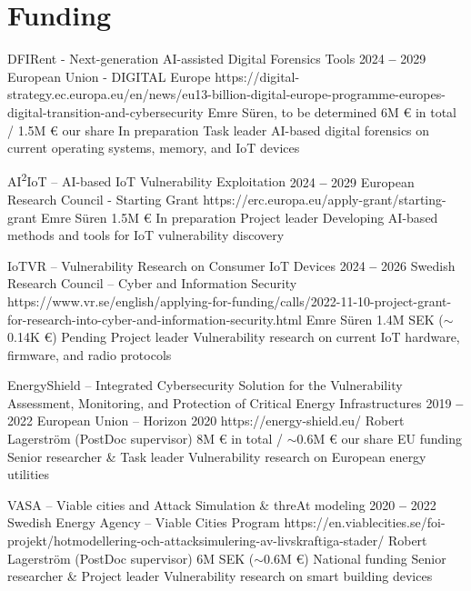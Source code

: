 

\section{Funding}


    \itemizeCVBegin[nolabel]{}
        
        \fundingItem
            {DFIRent - Next-generation AI-assisted Digital Forensics Tools}
            {2024 \textbf{--} 2029}
            {European Union - DIGITAL Europe}
            {https://digital-strategy.ec.europa.eu/en/news/eu13-billion-digital-europe-programme-europes-digital-transition-and-cybersecurity}
            {Emre Süren, to be determined}
            {6M € in total / 1.5M € our share}
            {In preparation}
            {Task leader}
            {AI-based digital forensics on current operating systems, memory, and IoT devices}

        \fundingItem
            {AI\textsuperscript{2}IoT – AI-based IoT Vulnerability Exploitation}
            {2024 \textbf{--} 2029}
            {European Research Council - Starting Grant}
            {https://erc.europa.eu/apply-grant/starting-grant}
            {Emre Süren}
            {1.5M €}
            {In preparation}
            {Project leader}
            {Developing AI-based methods and tools for IoT vulnerability discovery}

        \fundingItem
            {IoTVR – Vulnerability Research on Consumer IoT Devices}
            {2024 \textbf{--} 2026}
            {Swedish Research Council – Cyber and Information Security}
            {https://www.vr.se/english/applying-for-funding/calls/2022-11-10-project-grant-for-research-into-cyber-and-information-security.html}
            {Emre Süren}
            {1.4M SEK ($\sim$0.14K €)}
            {Pending}
            {Project leader}
            {Vulnerability research on current IoT hardware, firmware, and radio protocols}

        \fundingItem
            {EnergyShield – Integrated Cybersecurity Solution for the Vulnerability Assessment, Monitoring, and Protection of Critical Energy Infrastructures}
            {2019 \textbf{--} 2022}
            {European Union – Horizon 2020}
            {https://energy-shield.eu/}
            {Robert Lagerström (PostDoc supervisor)}
            {8M € in total / $\sim$0.6M € our share}
            {EU funding}
            {Senior researcher \& Task leader}
            {Vulnerability research on European energy utilities}

        \fundingItem
            {VASA – Viable cities and Attack Simulation \& threAt modeling}
            {2020 \textbf{--} 2022}
            {Swedish Energy Agency – Viable Cities Program}
            {https://en.viablecities.se/foi-projekt/hotmodellering-och-attacksimulering-av-livskraftiga-stader/}
            {Robert Lagerström (PostDoc supervisor)}
            {6M SEK ($\sim$0.6M €)}
            {National funding}
            {Senior researcher \& Project leader}
            {Vulnerability research on smart building devices}
                        
    \itemizeCVEnd